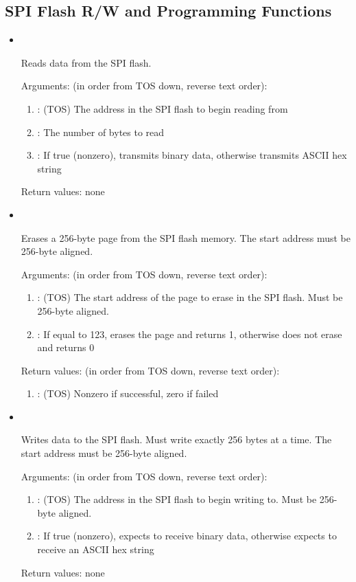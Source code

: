\subsection{SPI Flash R/W and Programming Functions} \label{ss:forthflash}
\begin{itemize}

\item {}\ 

\noindent Reads data from the SPI flash.

\noindent Arguments: (in order from TOS down, reverse text order):
\begin{enumerate}
\item {}: (TOS) The address in the SPI flash to begin reading from
\item {}: The number of bytes to read
\item {}: If true (nonzero), transmits binary data, otherwise transmits ASCII hex string
\end{enumerate}

\noindent Return values: none

\item {}\ 

\noindent Erases a 256-byte page from the SPI flash memory. The start address must be 256-byte aligned.

\noindent Arguments: (in order from TOS down, reverse text order):
\begin{enumerate}
\item {}: (TOS) The start address of the page to erase in the SPI flash. Must be 256-byte aligned.
\item {}: If equal to 123, erases the page and returns 1, otherwise does not erase and returns 0
\end{enumerate}

\noindent Return values: (in order from TOS down, reverse text order):
\begin{enumerate}
\item {}: (TOS) Nonzero if successful, zero if failed
\end{enumerate}

\item {}\ 

\noindent Writes data to the SPI flash. Must write exactly 256 bytes at a time. The start address must be 256-byte aligned.

\noindent Arguments: (in order from TOS down, reverse text order):
\begin{enumerate}
\item {}: (TOS) The address in the SPI flash to begin writing to. Must be 256-byte aligned.
\item {}: If true (nonzero), expects to receive binary data, otherwise expects to receive an ASCII hex string
\end{enumerate}

\noindent Return values: none

\end{itemize}

